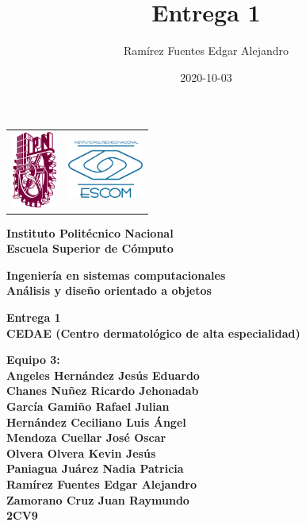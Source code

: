 \documentclass[12pt,letterpaper]{article}
\author{Ram\'irez Fuentes Edgar Alejandro}
\title{Entrega 1}
\date {2020-10-03}
\begin{document}
	\pagestyle{plain}
	{

		{
			\begin{tabular}
				{
					p{} 
					p{} 
				}
				\includegraphics[width=1.5cm, height=2.5cm]{ipn.png} &  
				\includegraphics[width=2.5cm, height=2cm]{escom.png}
			\end{tabular}
		}

		\begin{center}

			\par\vspace{1cm} %
			{
				\Huge\textbf
				{
					Instituto Polit\'ecnico Nacional 
					\\[.2cm]Escuela Superior de C\'omputo
				}
			}

			\par\vspace{0.5cm}
			{
				\Large\textbf
				{
					Ingenier\'ia en sistemas computacionales 
					\\[.5cm]An\'alisis y diseño orientado a objetos
				}
			}

			\vfill

			\par\vspace{0.5cm}
			{
				\Large\textbf
				{
					Entrega 1 \\
					CEDAE (Centro dermatológico de alta especialidad)
				}
			}

			\vfill

			\par\vspace{1cm}
			{
				\large\textbf
				{
                    Equipo 3:
                    \\Angeles Hernández Jesús Eduardo
                    \\Chanes Nuñez Ricardo Jehonadab
                    \\García Gamiño Rafael Julian
                    \\Hernández Ceciliano Luis Ángel
                    \\Mendoza Cuellar José Oscar
                    \\Olvera Olvera Kevin Jesús
                    \\Paniagua Juárez Nadia Patricia
                    \\Ramírez Fuentes Edgar Alejandro
                    \\Zamorano Cruz Juan Raymundo
					\\2CV9
				} 
			}


\end{center}}
\end{document}
